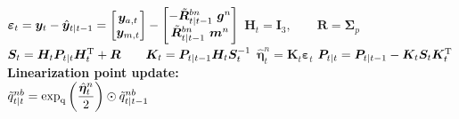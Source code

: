 \begin{algorithm}
\begin{algorithmic}[1]
		\STATE $ \bm{\varepsilon} _{t}   =   \bm{y}_{t} - \hat{\bm{y}} _{t | t-1}   =   \begin{bmatrix} \bm{y} _{a,t}  \\  \bm{y} _{m,t} \end{bmatrix}   -   \begin{bmatrix} - \tilde{\bm{R}} ^{bn} _{t | t-1} \ \bm{g} ^{n}  \\  \tilde{\bm{R}} ^{bn} _{t | t-1} \ \bm{m} ^{n} \end{bmatrix}  $ 
		\STATE $ \bm{H} _{t}   =   \bm{I} _{3} %
		,   \qquad   \bm{R}   =   \bm{\Sigma} _{p} $ \; %
		\STATE $ \bm{S} _{t}  =  \bm{H} _{t}  \bm{P} _{t | t}  \bm{H} _{t} ^\text{T}  + \bm{R}   \qquad   \bm{K} _{t}   =   \bm{P} _{t | t-1} \bm{H} _{t} \bm{S} ^{-1} _{t} $ 
		\STATE $ \hat{ \bm{\eta} } ^{n} _{t}   =   \bm{K} _{t}   \bm{\varepsilon} _{t} $ 
		\STATE $ \bm{P} _{t | t}  =  \bm{P} _{t | t-1}   -   \bm{K} _{t} \bm{S} _{t} \bm{K} _{t} ^\text{T} $  
		\STATE \textbf{Linearization point update:}\\
		\STATE $ \tilde{q} ^{nb} _{t | t}  =  \exp _\text{q} \left( \dfrac { \hat{ \bm{\eta} } ^{n} _{t} } {2} \right)  \odot  \tilde{q} ^{nb} _{t | t-1} $
		\ENDFOR
	\end{algorithmic}
\end{algorithm}


